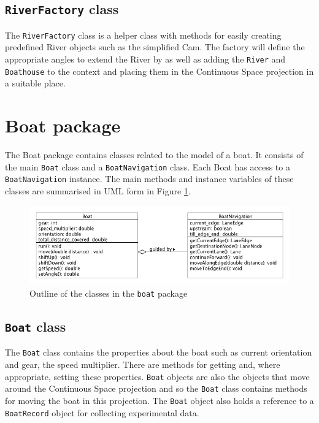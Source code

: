 \subsection{\texttt{RiverFactory} class}
The \texttt{RiverFactory} class is a helper class with methods for easily creating
predefined River objects such as the simplified Cam. The factory will
define the appropriate angles to extend the River by as well as adding
the \texttt{River} and \texttt{Boathouse} to the context and placing them in the
Continuous Space projection in a suitable place.

\section{Boat package}
The Boat package contains classes related to the model of a boat. It
consists of the main \texttt{Boat} class and a \texttt{BoatNavigation} class. Each Boat
has access to a \texttt{BoatNavigation} instance. The main methods and instance variables of these classes are summarised in UML form in Figure \ref{software:fig:boatUML}.

\begin{figure}
\begin{center}
  \includegraphics[scale=0.3]{images/boatpackage.png}
  \caption{Outline of the classes in the \texttt{boat} package}
  \label{software:fig:boatUML}
\end{center}
\end{figure}


\subsection{\texttt{Boat} class}
The \texttt{Boat} class contains the properties about the boat such as current
orientation and gear, the speed multiplier. There are methods for
getting and, where appropriate, setting these properties. \texttt{Boat} objects are also the
objects that move around the Continuous Space projection and so the
\texttt{Boat} class contains methods for moving the boat in this
projection. The \texttt{Boat} object also holds a reference to a \texttt{BoatRecord}
object for collecting experimental data.

